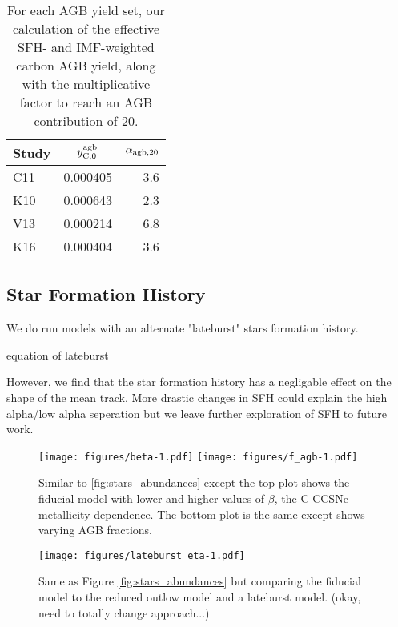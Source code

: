 \documentclass[fleqn,usenatbib]{mnras}
\begin{document}
\begin{table}
	\centering
	\caption{For each AGB yield set, our calculation of the effective SFH- and IMF-weighted carbon AGB yield, along with the multiplicative factor to reach an AGB contribution of 20.}
	\label{tab:alpha_agb}
	\begin{tabular}{lcr} %
		\hline
		Study & $y_{\rm C, 0}^{\rm agb}$ & $\alpha_{\rm agb, 20}$\\
		\hline
		C11 & 0.000405 & 3.6\\
		K10 & 0.000643 & 2.3\\
		V13 & 0.000214 & 6.8\\
		K16 & 0.000404 & 3.6\\
		\hline
	\end{tabular}
\end{table}



\subsection{Star Formation History}

We do run models with an alternate "lateburst" stars formation history.

equation of lateburst

However, we find that the star formation history has a negligable effect on the shape of the mean track. More drastic changes in SFH could explain the high alpha/low alpha seperation but we leave further exploration of SFH to future work. 





\begin{figure*}
\texttt{[image: figures/beta-1.pdf]}
\texttt{[image: figures/f\_agb-1.pdf]}

\caption{Similar to \ref{fig:stars_abundances} except the top plot shows the fiducial model with lower and higher values of $\beta$, the C-CCSNe metallicity dependence. The bottom plot is the same except shows varying AGB fractions.}
\end{figure*}

\begin{figure*}
\texttt{[image: figures/lateburst\_eta-1.pdf]}

\caption{Same as Figure \ref{fig:stars_abundances} but comparing the fiducial model to the reduced outlow model and a lateburst model. (okay, need to totally change approach...)}
\end{figure*}
\end{document}

